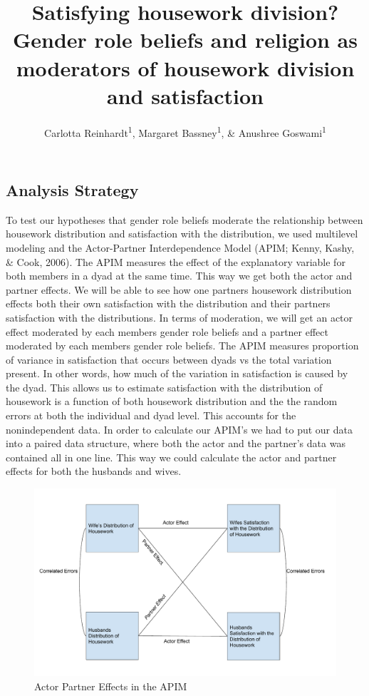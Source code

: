 \documentclass[
  english,
  man,floatsintext]{apa6}
\title{Satisfying housework division? Gender role beliefs and religion as moderators of housework division and satisfaction}
\author{Carlotta Reinhardt\textsuperscript{1}, Margaret Bassney\textsuperscript{1}, \& Anushree Goswami\textsuperscript{1}}
\date{}
\affiliation{\vspace{0.5cm}\textsuperscript{1} Smith College}
\begin{document}
\maketitle

\hypertarget{analysis-strategy}{%
\subsection{Analysis Strategy}\label{analysis-strategy}}

To test our hypotheses that gender role beliefs moderate the relationship between housework distribution and satisfaction with the distribution, we used multilevel modeling and the Actor-Partner Interdependence Model (APIM; Kenny, Kashy, \& Cook, 2006). The APIM measures the effect of the explanatory variable for both members in a dyad at the same time. This way we get both the actor and partner effects. We will be able to see how one partners housework distribution effects both their own satisfaction with the distribution and their partners satisfaction with the distributions. In terms of moderation, we will get an actor effect moderated by each members gender role beliefs and a partner effect moderated by each members gender role beliefs. The APIM measures proportion of variance in satisfaction that occurs between dyads vs the total variation present. In other words, how much of the variation in satisfaction is caused by the dyad. This allows us to estimate satisfaction with the distribution of housework is a function of both housework distribution and the the random errors at both the individual and dyad level. This accounts for the nonindependent data.
In order to calculate our APIM's we had to put our data into a paired data structure, where both the actor and the partner's data was contained all in one line. This way we could calculate the actor and partner effects for both the husbands and wives.



\begin{figure}
\centering
\includegraphics{APIM_Housework_Distribution.pdf}
\caption{\label{fig:my-figure}Actor Partner Effects in the APIM}
\end{figure}
\end{document}
